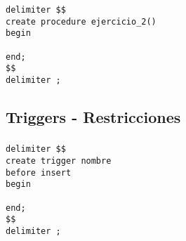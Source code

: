 \begin{verbatim}
delimiter $$
create procedure ejercicio_2()
begin

end;
$$
delimiter ;
\end{verbatim}

\newpage
\subsection{Triggers - Restricciones}

\subsubsection{}

\begin{verbatim}
delimiter $$
create trigger nombre
before insert 
begin

end;
$$
delimiter ;
\end{verbatim}
